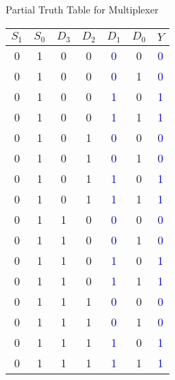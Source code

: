 \begin{frame}{Partial Truth Table for Multiplexer}
\begin{multicols}{2}
\begin{center}
\small
		\begin{tabular}{cc|cccc|c}
		 $S_1$ & $S_0$ & $D_3$ & $D_2$ &$D_1$ & $D_0$ & $Y$\\\hline
   0 & 1 & 0 & 0 & \textcolor{blue}{0} & 0 & \textcolor{blue}{0} \\
   0 & 1 & 0 & 0 & \textcolor{blue}{0} & 1 &\textcolor{blue}{0} \\
   0 & 1 & 0 & 0 & \textcolor{blue}{1} & 0 & \textcolor{blue}{1} \\
   0 & 1 & 0 & 0 & \textcolor{blue}{1} & 1 &\textcolor{blue}{1} \\
   0 & 1 & 0 & 1 &  \textcolor{blue}{0} & 0 & \textcolor{blue}{0} \\
    0 & 1 & 0 & 1 &  \textcolor{blue}{0} & 1& \textcolor{blue}{0} \\
    0 &1 & 0 & 1 &  \textcolor{blue}{1} & 0 & \textcolor{blue}{1} \\
    0 & 1 & 0 & 1 &  \textcolor{blue}{1} & 1& \textcolor{blue}{1} \\
   \hline
  0 & 1 & 1 & 0 & \textcolor{blue}{0} & 0 & \textcolor{blue}{0} \\
   0 & 1 & 1 & 0 & \textcolor{blue}{0} & 1 &\textcolor{blue}{0} \\
   0 & 1 & 1 & 0 & \textcolor{blue}{1} & 0 & \textcolor{blue}{1} \\
   0 & 1 & 1 & 0 & \textcolor{blue}{1} & 1 &\textcolor{blue}{1} \\
   0 & 1 & 1 & 1 &  \textcolor{blue}{0} & 0 & \textcolor{blue}{0} \\
    0 & 1 &1 & 1 &  \textcolor{blue}{0} & 1& \textcolor{blue}{0} \\
    0 &1 & 1 & 1 &  \textcolor{blue}{1} & 0 & \textcolor{blue}{1} \\
    0 & 1 & 1 & 1 &  \textcolor{blue}{1} & 1& \textcolor{blue}{1} \\
    \hline
		\end{tabular}
		\end{center}
  \end{multicols}
\end{frame}


